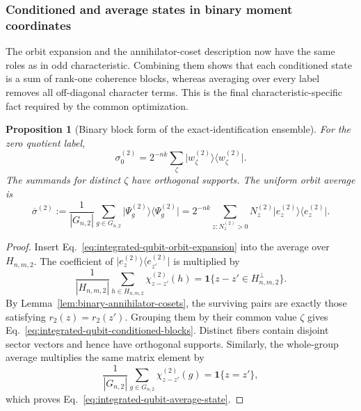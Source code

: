 \documentclass[11pt]{article}
\newcommand{\1}{\mathbf 1}
\newcommand{\ket}[1]{\lvert #1\rangle}
\newcommand{\bra}[1]{\langle #1\rvert}
\theoremstyle{plain}
\newtheorem{proposition}[theorem]{Proposition}
\theoremstyle{definition}
\theoremstyle{remark}
\begin{document}
\subsubsection{Conditioned and average states in binary moment coordinates}
The orbit expansion and the annihilator-coset description now have the same roles as in odd characteristic.  Combining them shows that each conditioned state is a sum of rank-one coherence blocks, whereas averaging over every label removes all off-diagonal character terms.  This is the final characteristic-specific fact required by the common optimization.
\begin{proposition}[Binary block form of the exact-identification ensemble]
\label{prop:binary-conditioned-average-block-form}
For the zero quotient label,
\begin{equation}
 \sigma_0^{(2)}
 =2^{-nk}\sum_\zeta
   \ket{w_\zeta^{(2)}}\!\bra{w_\zeta^{(2)}}.
 \label{eq:integrated-qubit-conditioned-blocks}
\end{equation}
The summands for distinct $\zeta$ have orthogonal supports.  The uniform orbit
average is
\begin{equation}
 \overline\sigma^{(2)}
 :=\frac1{|G_{n,2}|}\sum_{g\in G_{n,2}}
   \ket{\Psi_g^{(2)}}\!\bra{\Psi_g^{(2)}}
 =2^{-nk}\sum_{z:N_z^{(2)}>0}
   N_z^{(2)}\ket{e_z^{(2)}}\!\bra{e_z^{(2)}}.
 \label{eq:integrated-qubit-average-state}
\end{equation}
\end{proposition}
\begin{proof}
Insert Eq.~\eqref{eq:integrated-qubit-orbit-expansion} into the average over
$H_{n,m,2}$.  The coefficient of
$\ket{e_z^{(2)}}\!\bra{e_{z'}^{(2)}}$ is multiplied by
\begin{equation}
 \frac1{|H_{n,m,2}|}\sum_{h\in H_{n,m,2}}
 \chi_{z-z'}^{(2)}(h)
 =\mathbf1\{z-z'\in H_{n,m,2}^\perp\}.
 \label{eq:binary-subgroup-character-orthogonality}
\end{equation}
By Lemma~\ref{lem:binary-annihilator-cosets}, the surviving pairs are exactly
those satisfying $r_2(z)=r_2(z')$.  Grouping them by their common value
$\zeta$ gives Eq.~\eqref{eq:integrated-qubit-conditioned-blocks}.  Distinct
fibers contain disjoint sector vectors and hence have orthogonal supports.
Similarly, the whole-group average multiplies the same matrix element by
\begin{equation}
 \frac1{|G_{n,2}|}\sum_{g\in G_{n,2}}
 \chi_{z-z'}^{(2)}(g)=\mathbf1\{z=z'\},
 \label{eq:binary-whole-group-character-orthogonality}
\end{equation}
which proves Eq.~\eqref{eq:integrated-qubit-average-state}.
\end{proof}
\end{document}
